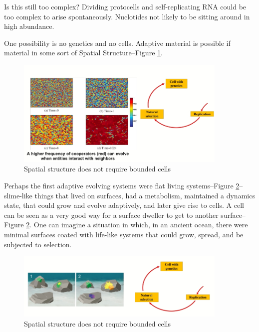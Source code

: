 \documentclass[]{article}
\begin{document}
Is this still too complex? Dividing protocells and self-replicating RNA could
be too complex to arise spontaneously. Nuclotides not likely to be sitting around in high abundance.

One possibility is no genetics and no cells. Adaptive material is possible if material in some sort of Spatial Structure--Figure \ref{fig:WangWang}\cite{wang2015evolution}.

\begin{figure}[H]
	\caption{Spatial structure does not require bounded cells}\label{fig:WangWang}
	\includegraphics[width=0.9\textwidth]{WangWang}
\end{figure}

Perhaps the first adaptive evolving systems were flat living systems--Figure \ref{fig:Baum2018}\cite{baum2018origin}--slime-like things that lived on surfaces, had a metabolism, maintained a dynamics state, that could grow and evolve adaptively, and later give rise to cells. A cell can be seen as a very good way for a surface dweller to get to another surface--Figure \ref{fig:Baum2018}. One can imagine a situation in which, in an ancient ocean, there were minimal surfaces coated with life-like systems that could grow, spread, and be subjected to selection.

\begin{figure}[H]
	\caption{Spatial structure does not require bounded cells}\label{fig:Baum2018}
	\includegraphics[width=0.9\textwidth]{Baum2018}
\end{figure}
\end{document}
